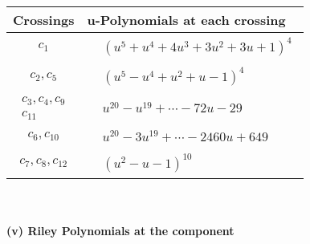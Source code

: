 \documentclass[1p]{elsarticle_modified}
\theoremstyle{definition}
\begin{document}
\begin{tabular}{m{50pt}|m{274pt}}
Crossings & \hspace{64pt}u-Polynomials at each crossing \\
\hline $$\begin{aligned}c_{1}\end{aligned}$$&$\begin{aligned}
&(u^5+u^4+4 u^3+3 u^2+3 u+1)^4
\end{aligned}$\\
\hline $$\begin{aligned}c_{2},c_{5}\end{aligned}$$&$\begin{aligned}
&(u^5- u^4+u^2+u-1)^4
\end{aligned}$\\
\hline $$\begin{aligned}c_{3},c_{4},c_{9}\\c_{11}\end{aligned}$$&$\begin{aligned}
&u^{20}- u^{19}+\cdots-72 u-29
\end{aligned}$\\
\hline $$\begin{aligned}c_{6},c_{10}\end{aligned}$$&$\begin{aligned}
&u^{20}-3 u^{19}+\cdots-2460 u+649
\end{aligned}$\\
\hline $$\begin{aligned}c_{7},c_{8},c_{12}\end{aligned}$$&$\begin{aligned}
&(u^2- u-1)^{10}
\end{aligned}$\\
\hline
\end{tabular}\\~\\
\newpage\renewcommand{\arraystretch}{1}
\flushleft \textbf{(v) Riley Polynomials at the component}\newline \\
\end{document}
